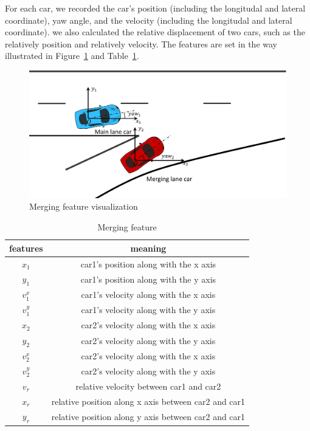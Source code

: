 \documentclass[conference]{IEEEtran}
\begin{document}
For each car, we recorded the car's position (including the longitudal and lateral coordinate), yaw angle, and the velocity (including the longitudal and lateral coordinate). we also calculated the relative displacement of two cars, such as the relatively position and relatively velocity. The features are set in the way illustrated in Figure~\ref{fig:mergeFeat} and Table~\ref{tb:mergeFeat}.

\begin{figure}[H]
	\centering
	\includegraphics[scale=0.1]{coordi.png}
	\caption{Merging feature visualization}
	\label{fig:mergeFeat}
\end{figure}

\begin{table}
\centering
\caption{Merging feature}\label{tb:mergeFeat}
\begin{tabular}{c | c}

\hline
features &  meaning\\
\hline
$x_{1}$ & car1's position along with the x axis\\
$y_{1}$ & car1's position along with the y axis\\
$v^x_{1}$ & car1's velocity along with the x axis\\
$v^y_{1}$ & car1's velocity along with the y axis\\
$x_{2}$ & car2's velocity along with the x axis\\
$y_{2}$ & car2's velocity along with the y axis\\
$v^x_{2}$ & car2's velocity along with the x axis\\
$v^y_{2}$ & car2's velocity along with the y axis\\
$v_r$ & relative velocity between car1 and car2\\
$x_r$ & relative position along x axis between car2 and car1\\
$y_r$ & relative position along y axis between car2 and car1\\
\hline
\end{tabular}
\end{table}
\end{document}
